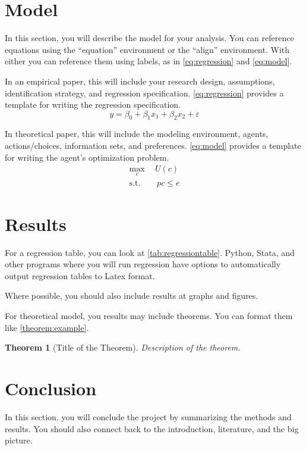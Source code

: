 \documentclass[12pt]{article}
\newtheorem{theorem}{Theorem}
\begin{document}
\section{Model}
In this section, you will describe the model for your analysis. You can reference equations using the ``equation'' environment or the ``align'' environment. With either you can reference them using labels, as in \autoref{eq:regression} and \autoref{eq:model}.

 In an empirical paper, this will include your research design, assumptions, identification strategy, and regression specification. \autoref{eq:regression} provides a template for writing the regression specification.
\begin{equation}\label{eq:regression}
    y = \beta_0 +\beta_1x_1 + \beta_2x_2 +\varepsilon
\end{equation}


 In theoretical paper, this will include the modeling environment, agents, actions/choices, information sets, and preferences. \autoref{eq:model} provides a template for writing the agent's optimization problem.
\begin{align}\label{eq:model}
    \max_c\ &\ U(c) \\
    \text{s.t.} &\ \ p c \leq e  \nonumber 
\end{align}


\section{Results}

For a regression table, you can look at \autoref{tab:regressiontable}. Python, Stata, and other programs where you will run regression have options to automatically output regression tables to Latex format. 

\begin{table}[ht]
    \centering
    \caption{Regression Results}
    \label{tab:regressiontable}
    
    \caption*{\footnotesize \textit{Note: Describe the table above.}}
\end{table}

Where possible, you should also include results at graphs and figures.

For theoretical model, you results may include theorems. You can format them like \autoref{theorem:example}.
\begin{theorem}[Title of the Theorem]\label{theorem:example}
    Description of the theorem.
\end{theorem}

\section{Conclusion}
In this section, you will conclude the project by summarizing the methods and results. You should also connect back to the introduction, literature, and the big picture.

\newpage
\singlespacing

\end{document}
